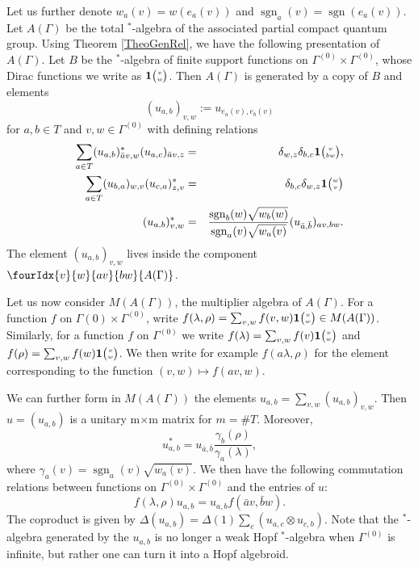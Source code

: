 \documentclass[10pt]{article}
\DeclareMathOperator{\sgn}{\mathrm{sgn}}
\newcommand{\Grt}[3]{#1{\tiny {\begin{pmatrix} #2\\#3\end{pmatrix}}}}
\newcommand{\UnitC}[2]{\Grt{\mathbf{1}}{#1}{#2}}
\newcommand{\Gr}[5]{\fourIdx{#2}{#4}{#3}{#5}{#1}}%
\theoremstyle{definition}
\numberwithin{equation}{section}
\begin{document}
Let us further denote $w_a(v) = w(e_a(v))$ and $\sgn_a(v) = \sgn(e_a(v))$. Let $A(\Gamma)$ be the total $^*$-algebra of the associated partial compact quantum group. Using Theorem \ref{TheoGenRel}, we have the following presentation of $A(\Gamma)$. Let $B$ be the $^*$-algebra of finite support functions on $\Gamma^{(0)}\times \Gamma^{(0)}$, whose Dirac functions we write as $\UnitC{v}{w}$. Then $A(\Gamma)$ is generated by a copy of $B$ and elements \[(u_{a,b})_{v,w} := u_{e_a(v),e_b(v)}\] for $a,b\in T$ and $v,w\in \Gamma^{(0)}$ with defining relations \begin{eqnarray*} \sum_{a\in T} (u_{a,b})_{\bar{a}v,w}^* (u_{a,c})_{\bar{a}v,z}&=& \delta_{w,z} \delta_{b,c} \UnitC{v}{bw},\\ \sum_{a\in T} (u_{b,a})_{w,v} (u_{c,a})_{z,v}^* &=& \delta_{b,c}\delta_{w,z} \UnitC{w}{v}\\ (u_{a,b})_{v,w}^* &=& \frac{\sgn_b(w)\sqrt{w_b(w)}}{\sgn_a(v)\sqrt{w_a(v)}}(u_{\bar{a},\bar{b}})_{av,bw}.\end{eqnarray*} The element $(u_{a,b})_{v,w}$ lives inside the component $\Gr{A(\Gamma)}{v}{av}{w}{bw}$.

Let us now consider $M(A(\Gamma))$, the multiplier algebra of $A(\Gamma)$. For a function $f$ on $\Gamma{(0)}\times \Gamma^{(0)}$, write $f(\lambda,\rho) = \sum_{v,w} f(v,w)\UnitC{v}{w} \in M(A(\Gamma))$. Similarly, for a function $f$ on $\Gamma^{(0)}$ we write $f(\lambda) = \sum_{v,w} f(v)\UnitC{v}{w}$ and $f(\rho) = \sum_{v,w}f(w)\UnitC{v}{w}$. We then write for example $f(a\lambda,\rho)$ for the element corresponding to the function $(v,w)\mapsto f(av,w)$.

We can further form in $M(A(\Gamma))$ the elements $u_{a,b} = \sum_{v,w} (u_{a,b})_{v,w}$. Then $u=(u_{a,b})$ is a unitary m$\times$m matrix for $m=\#T$. Moreover, \begin{equation}\label{EqAdju}u_{a,b}^* =  u_{\bar{a},\bar{b}}\frac{\gamma_b(\rho)}{\gamma_a(\lambda)},\end{equation} where $\gamma_a(v) = \sgn_a(v)\sqrt{w_a(v)}$.   We then have the following commutation relations between functions on $\Gamma^{(0)}\times \Gamma^{(0)}$ and the entries of $u$: \begin{equation}\label{EqGradu} f(\lambda,\rho)u_{a,b} = u_{a,b}f(\bar{a}v,\bar{b}w).\end{equation} The coproduct is given by $\Delta(u_{a,b}) = \Delta(1) \sum_c(u_{a,c}\otimes u_{c,b})$. Note that the $^*$-algebra generated by the $u_{a,b}$ is no longer a weak Hopf $^*$-algebra when $\Gamma^{(0)}$ is infinite, but rather one can turn it into a Hopf algebroid. %
\end{document}
